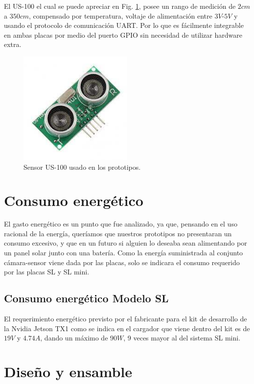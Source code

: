 El US-100 el cual se puede apreciar en Fig. \ref{fig:sensor-US100}, posee un rango de medición de $2cm$ a $350cm$, compensado por temperatura, voltaje de alimentación entre $3V$-$5V$ y usando el protocolo de
comunicación UART.
Por lo que es fácilmente integrable en ambas placas por medio del puerto GPIO sin necesidad de utilizar hardware extra.
\begin{figure}
    \centering
    \includegraphics[width=0.5\textwidth]{imgs/us-100.jpg}
    \caption{Sensor US-100 usado en los prototipos.}
    \label{fig:sensor-US100}
\end{figure}

\section{Consumo energético}

El gasto energético es un punto que fue analizado, ya que, pensando en el uso racional de la energía, queríamos que nuestros prototipos no
presentaran un consumo excesivo, y que en un futuro si alguien lo deseaba sean alimentando por un panel solar junto con una batería.
Como la energía suministrada al conjunto cámara-sensor viene dada por las placas, solo se indicara el consumo requerido por las placas SL y SL mini.
\subsection{Consumo energético Modelo SL}

El requerimiento energético previsto por el fabricante para el kit de desarrollo de la Nvidia Jetson TX1 como se indica
en el cargador que viene dentro del kit es de $19V$ y $4.74A$, dando un máximo de $90W$, 9 veces mayor al del sistema SL mini.

\section{Diseño y ensamble}

